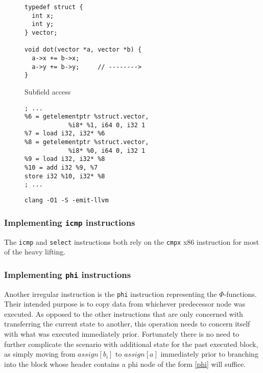 \documentclass{article}
\begin{document}
\begin{figure}[H]
   \begin{minipage}{0.48\textwidth}
     \centering
     \begin{verbatim}
typedef struct {
  int x;
  int y;
} vector;

void dot(vector *a, vector *b) {
  a->x += b->x;
  a->y += b->y;     // -------->
}

     \end{verbatim}
     \caption{Subfield access}\label{fig:vector.c}
   \end{minipage}
   \begin{minipage}{0.48\textwidth}
     \centering
     \begin{verbatim}
; ...
%6 = getelementptr %struct.vector,
            %i8* %1, i64 0, i32 1
%7 = load i32, i32* %6
%8 = getelementptr %struct.vector,
            %i8* %0, i64 0, i32 1
%9 = load i32, i32* %8
%10 = add i32 %9, %7
store i32 %10, i32* %8
; ...
     \end{verbatim}
     \caption{\texttt{clang -O1 -S -emit-llvm}}\label{fig:vector.ll}
   \end{minipage}
\end{figure}


\subsubsection{Implementing \texttt{icmp} instructions} \label{impl-cond}
The \texttt{icmp} and \texttt{select} instructions both rely on the \texttt{cmpx} x86 instruction for most of the heavy lifting.

\subsubsection{Implementing \texttt{phi} instructions}\label{impl-phi}
Another irregular instruction is the \texttt{phi} instruction representing the \(\Phi\)-functions. Their  intended purpose is to copy data from whichever predecessor node was executed.
As opposed to the other instructions that are only concerned with transferring the current state to another, this operation needs to concern itself with what was executed immediately prior.
Fortunately there is no need to further complicate the scenario with additional state for the past executed block, as simply moving from \(\mathit{assign}[b_i]\) to \(\mathit{assign}[a]\) immediately prior to branching into the block whose header contains a phi node of the form \eqref{phi} will suffice.
\end{document}
